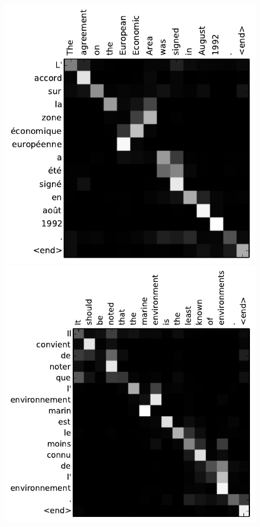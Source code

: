 \documentclass{report}
\begin{document}
\begin{figure}[ht]
    \centering
    \begin{minipage}[b]{0.48\textwidth}
        \raggedleft
        \includegraphics[width=1.\columnwidth]{figures/EEA.pdf}
    \end{minipage}
    \hfill
    \begin{minipage}[b]{0.48\textwidth}
        \raggedleft
        \includegraphics[width=1.\columnwidth]{figures/1511.pdf}
    \end{minipage}


\end{figure}
\end{document}
